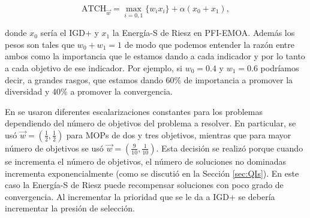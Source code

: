 \begin{equation} \label{eq:ATCH2}
    \text{ATCH}_{\vec{w}}=\max_{i=0,1} \{w_ix_i\}+\alpha (x_0+x_1),  
\end{equation}

donde $x_0$ sería el IGD+ y $x_1$ la Energía-S de Riesz en PFI-EMOA. Además los pesos son tales que $ w_0+w_1=1$ de modo que podemos entender la razón entre ambos como la importancia que le estamos dando a cada indicador y por lo tanto a cada objetivo de ese indicador. Por ejemplo, si $w_0=0.4$ y $w_1=0.6$ podríamos decir, a grandes rasgos, que estamos dando 60\% de importancia a promover la diversidad y 40\% a promover la convergencia.   

En \cite{PFI} se usaron diferentes escalarizaciones constantes para los problemas dependiendo del número de objetivos del problema a resolver. En particular, se usó $\vec{w}=(\frac{1}{2},\frac{1}{2})$ para MOPs de dos y tres objetivos, mientras que para mayor número de objetivos se usó $\vec{w}=(\frac{9}{10},\frac{1}{10})$. Esta decisión se realizó porque cuando se incrementa el número de objetivos, el número de soluciones no dominadas incrementa exponencialmente (como se discutió en la Sección \ref{sec:QIs}). En este caso la Energía-S de Riesz puede recompensar soluciones con poco grado de convergencia. Al incrementar la prioridad que se le da a IGD+ se debería incrementar la presión de selección. 

